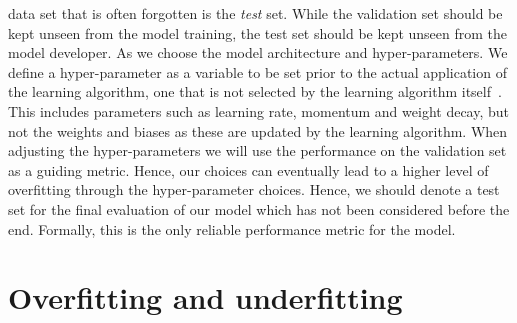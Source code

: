 data set that is often forgotten is the \textit{test} set. While the
validation set should be kept unseen from the model training, the test set
should be kept unseen from the model developer. As we choose the model
architecture and hyper-parameters. We define a hyper-parameter as a variable to be set prior to the actual application of the learning algorithm, one that is not selected by the learning algorithm itself~\cite{Bengio2012}. This includes parameters such as learning rate, momentum and weight decay, but not the weights and biases as these are updated by the learning algorithm. When adjusting the hyper-parameters we will use the performance on the validation set as a guiding metric. Hence, our choices can eventually lead to a higher level of overfitting through the hyper-parameter choices. Hence, we should denote a test set for the final evaluation of our model which has not been considered before the end. Formally, this is the only reliable performance metric for the model. 


\section{Overfitting and underfitting}

